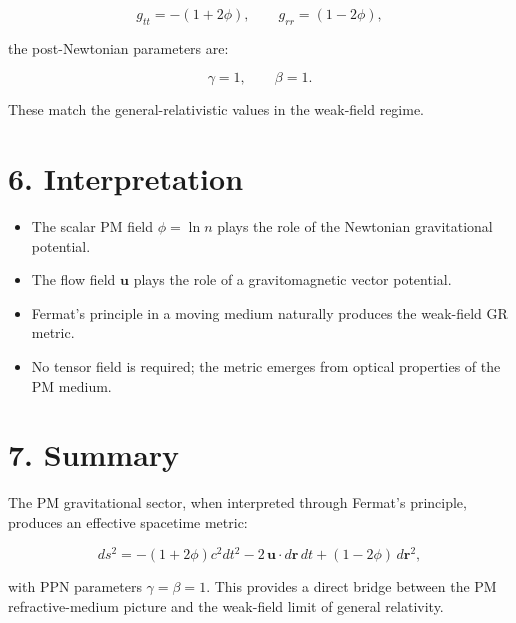 \documentclass{article}
\begin{document}
\[
g_{tt} = -(1 + 2\phi),
\qquad
g_{rr} = (1 - 2\phi),
\]



the post-Newtonian parameters are:



\[
\gamma = 1,
\qquad
\beta = 1.
\]



These match the general-relativistic values in the weak-field regime.

\section*{6. Interpretation}

\begin{itemize}
    \item The scalar PM field $\phi = \ln n$ plays the role of the Newtonian
          gravitational potential.
    \item The flow field $\mathbf u$ plays the role of a gravitomagnetic vector
          potential.
    \item Fermat’s principle in a moving medium naturally produces the
          weak-field GR metric.
    \item No tensor field is required; the metric emerges from optical
          properties of the PM medium.
\end{itemize}

\section*{7. Summary}

The PM gravitational sector, when interpreted through Fermat’s principle,
produces an effective spacetime metric:



\[
ds^2
=
-(1 + 2\phi)c^2 dt^2
- 2\,\mathbf u\cdot d\mathbf r\,dt
+
(1 - 2\phi)\,d\mathbf r^2,
\]



with PPN parameters $\gamma = \beta = 1$. This provides a direct bridge between
the PM refractive-medium picture and the weak-field limit of general relativity.
\end{document}
